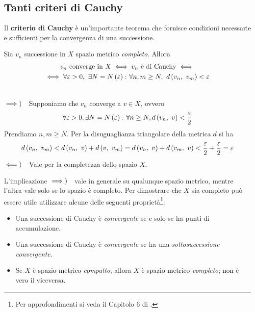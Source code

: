 \subsection{Tanti criteri di Cauchy}\label{criteriodicauchy}
Il \textbf{criterio di Cauchy} è un'importante teorema che fornisce condizioni necessarie e sufficienti per la convergenza di una successione.
\begin{theorema}
		Sia $v_n$ successione in $X$ spazio metrico \textit{completo}. Allora
	\begin{multline}
		v_n\text{ converge in }X \iff v_n\text{ è di Cauchy}\iff\\
		\iff\forall \epsilon >0,\ \exists N=N\left(\epsilon\right)\colon\forall n,m\geq N,\ \mvf{d}{v_n}{v_m}<\epsilon
	\end{multline}
\end{theorema}
\begin{demonstration}~{}\\
	$\implies)\quad$Supponiamo che $v_n$ converge a $v\in X$, ovvero
	\begin{equation*}
		\forall \varepsilon>0,\exists N=N\left(\varepsilon\right)\colon\forall n\geq N,d\left(v_n,\ v\right)<\frac{\varepsilon}{2}
	\end{equation*}
	Prendiamo $n,m\geq N$. Per la disuguaglianza triangolare della metrica $d$ si ha
	\begin{equation*}
		d\left(v_n,\ v_m\right)<d\left(v_n,\ v\right)+d\left(v,\ v_m\right)=d\left(v_n,\ v\right)+d\left(v_m,\ v\right)<\frac{\varepsilon}{2}+\frac{\varepsilon}{2}=\varepsilon
	\end{equation*}
	$\impliedby)\quad$Vale per la completezza dello spazio $X$.
\end{demonstration}
\begin{observe}
	L'implicazione $\implies)\quad$vale in generale su qualunque spazio metrico, mentre l'altra vale solo se lo spazio è completo. Per dimostrare che $X$ sia completo può essere utile utilizzare alcune delle seguenti proprietà\footnote{Per approfondimenti si veda il Capitolo 6 di \cite{antucabertolotti:2021manualozzogeometria}.}:
	\begin{itemize}
		\item Una successione di Cauchy è \textit{convergente} se e solo se ha punti di accumulazione.
		\item Una successione di Cauchy è \textit{convergente} se ha una \textit{sottosuccessione convergente}.
		\item Se $X$ è spazio metrico \textit{compatto}, allora $X$ è spazio metrico \textit{completo}; non è vero il viceversa.
	\end{itemize}
\end{observe}
